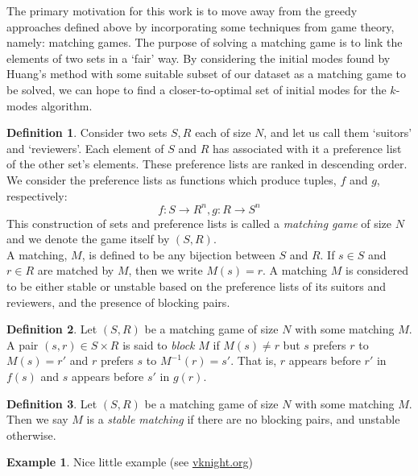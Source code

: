 \documentclass{article}
\theoremstyle{definition}
\newtheorem{definition}{Definition}[section]
\newtheorem{example}{Example}
\begin{document}
The primary motivation for this work is to move away from the greedy approaches
defined above by incorporating some techniques from game theory, namely:
matching games. The purpose of solving a matching game is to link the elements
of two sets in a `fair' way. By considering the initial modes found by Huang's 
method with some suitable subset of our dataset as a matching game to be solved, 
we can hope to find a closer-to-optimal set of initial modes for the $k$-modes 
algorithm.


\begin{definition}\label{def:matching-game}
	Consider two sets $S, R$ each of size $N$, and let us call them `suitors' 
    and `reviewers'. Each element of $S$ and $R$ has associated with it a 
    preference list of the other set's elements. These preference lists are 
    ranked in descending order. We consider the preference lists as functions 
    which produce tuples, $f$ and $g$, respectively:
	\[
	f : S \to R^n, g : R \to S^n
	\]
	This construction of sets and preference lists is called a 
    \emph{matching game} of size $N$ and we denote the game itself by $(S,R)$.
    \\
	
	A matching, $M$, is defined to be any bijection between $S$ and $R$. If 
    $s \in S$ and $r \in R$ are matched by $M$, then we write $M(s) = r$. A 
    matching $M$ is considered to be either stable or unstable based on the 
    preference lists of its suitors and reviewers, and the presence of blocking 
    pairs.
\end{definition}

\begin{definition}\label{def:blocking-pair}
	Let $(S, R)$ be a matching game of size $N$ with some matching $M$. A pair 
    $(s, r) \in S \times R$ is said to \emph{block} $M$ if $M(s) \ne r$ but $s$ 
    prefers $r$ to $M(s) = r'$ and $r$ prefers $s$ to $M^{-1}(r) = s'$. That is,
    $r$ appears before $r'$ in $f(s)$ and $s$ appears before $s'$ in $g(r)$.
\end{definition}

\begin{definition}\label{def:stable-matching}
	Let $(S, R)$ be a matching game of size $N$ with some matching $M$. Then we 
    say $M$ is a \emph{stable matching} if there are no blocking pairs, and 
    unstable otherwise.
\end{definition}

\begin{example}\label{example:matching}
    Nice little example (see \url{vknight.org})
\end{example}
\end{document}
